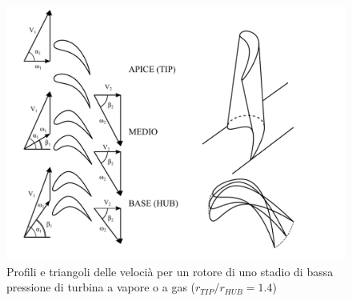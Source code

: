 \begin{figure}
\centering
  \includegraphics[width=.8\textwidth]{fig/TurbVortLib.pdf}
\caption{Profili e triangoli delle velocià per un rotore di uno stadio di bassa pressione di turbina a vapore o a gas ($r_{TIP}/r_{HUB} =1.4$)}
\label{fig:TurbVortLib}
\end{figure}

